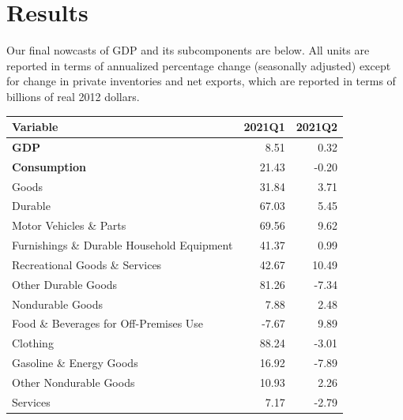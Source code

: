 \documentclass[11pt, letterpaper]{article}\usepackage[]{graphicx}\usepackage[]{color}
\begin{document}
\section{Results}
Our final nowcasts of GDP and its subcomponents are below. All units are reported in terms of annualized percentage change (seasonally adjusted) except for change in private inventories and net exports, which are reported in terms of billions of real 2012 dollars.
\begin{table}[H]
\centering
\begingroup\fontsize{11pt}{13pt}\selectfont
\begin{tabular}{lrr}
  \hline
Variable & 2021Q1 & 2021Q2 \\ 
  \hline
\hspace{0mm} \textbf{GDP} & 8.51 & 0.32 \\ 
  \hspace{0mm} \textbf{Consumption} & 21.43 & -0.20 \\ 
  \hspace{8mm}  Goods & 31.84 & 3.71 \\ 
  \hspace{16mm}  Durable & 67.03 & 5.45 \\ 
  \hspace{24mm}  Motor Vehicles \& Parts & 69.56 & 9.62 \\ 
  \hspace{24mm}  Furnishings \& Durable Household Equipment & 41.37 & 0.99 \\ 
  \hspace{24mm}  Recreational Goods \& Services & 42.67 & 10.49 \\ 
  \hspace{24mm}  Other Durable Goods & 81.26 & -7.34 \\ 
  \hspace{16mm}  Nondurable Goods & 7.88 & 2.48 \\ 
  \hspace{24mm}  Food \& Beverages for Off-Premises Use & -7.67 & 9.89 \\ 
  \hspace{24mm}  Clothing & 88.24 & -3.01 \\ 
  \hspace{24mm}  Gasoline \& Energy Goods & 16.92 & -7.89 \\ 
  \hspace{24mm}  Other Nondurable Goods & 10.93 & 2.26 \\ 
  \hspace{8mm}  Services & 7.17 & -2.79 \\ 

\end{tabular}
\end{table}
\end{document}
